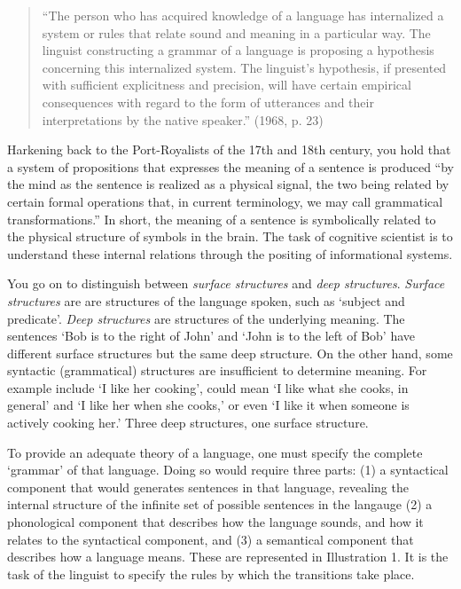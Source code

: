 \begin{refsection}
\begin{quote}
“The person who has acquired knowledge of a language has internalized a system or rules that relate sound and meaning in a particular way. The linguist constructing a grammar of a language is proposing a hypothesis concerning this internalized system. The linguist's hypothesis, if presented with sufficient explicitness and precision, will have certain empirical consequences with regard to the form of utterances and their interpretations by the native speaker.” (1968, p. 23)
\end{quote}

Harkening back to the Port-Royalists of the 17th and 18th century, you hold that a system of propositions that expresses the meaning of a sentence is produced “by the mind as the sentence is realized as a physical signal, the two being related by certain formal operations that, in current terminology, we may call grammatical transformations.” In short, the meaning of a sentence is symbolically related to the physical structure of symbols in the brain. The task of cognitive scientist is to understand these internal relations through the positing of informational systems.

You go on to distinguish between \emph{surface structures} and \emph{deep structures}. \emph{Surface structures} are are structures of the language spoken, such as `subject and predicate'. \emph{Deep structures} are structures of the underlying meaning. The sentences `Bob is to the right of John' and `John is to the left of Bob' have different surface structures but the same deep structure. On the other hand, some syntactic (grammatical) structures are insufficient to determine meaning. For example include `I like her cooking', could mean `I like what she cooks, in general' and `I like her when she cooks,' or even `I like it when someone is actively cooking her.' Three deep structures, one surface structure.

To provide an adequate theory of a language, one must specify the complete `grammar' of that language. Doing so would require three parts: (1) a syntactical component that would generates sentences in that language, revealing the internal structure of the infinite set of possible sentences in the langauge (2) a phonological component that describes how the language sounds, and how it relates to the syntactical component, and (3) a semantical component that describes how a language means. These are represented in Illustration 1. It is the task of the linguist to specify the rules by which the transitions take place.


\end{refsection}
